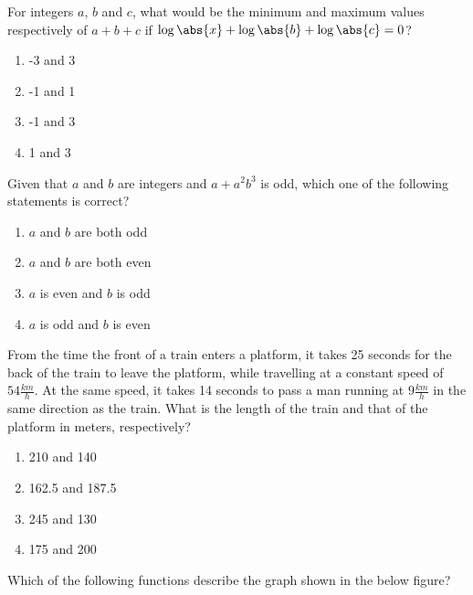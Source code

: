 	\item 
	For integers $a$, $b$ and $c$, what would be the minimum and maximum values respectively of $a + b + c$ if $\log{\abs{x}} + \log{\abs{b} + \log{\abs{c}} = 0}$?

	\hfill{}
	\begin{multicols}{4}
		\begin{enumerate}
			\item -3 and 3
			\item -1 and 1
			\item -1 and 3
			\item 1 and 3
		\end{enumerate}
	\end{multicols}

	\item 
	Given that $a$ and $b$ are integers and $a + a^2b^3$ is odd, which one of the following statements is correct?

	\begin{enumerate}
		\item $a$ and $b$ are both odd
		\item $a$ and $b$ are both even 
		\item $a$ is even and $b$ is odd 
		\item $a$ is odd and $b$ is even 
	\end{enumerate}

	\item 
	From the time the front of a train enters a platform, it takes 25 seconds for the back of the train to leave the platform, while travelling at a constant speed of $54 \frac{km}{h}$. At the same speed, it takes 14 seconds to pass a man running at $9\frac{km}{h}$ in the same direction as the train. What is the length of the train and that of the platform in meters, respectively?

	\hfill{}
	\begin{multicols}{2}
		\begin{enumerate}
			\item 210 and 140
			\item 162.5 and 187.5
			\item 245 and 130
			\item 175 and 200
		\end{enumerate}
	\end{multicols}

	\item 
	Which of the following functions describe the graph shown in the below figure?
	
